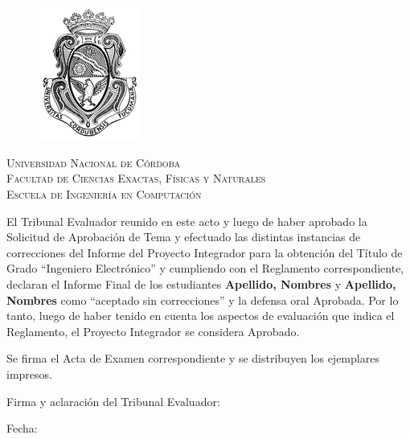 \chapter*{}
\begin{center}
	
	\begin{figure}[h]
		\begin{center}
			\includegraphics[scale=0.8]{logo_unc.png}
		\end{center}
	\end{figure}
	\vspace{0.25em}
	
	\textsc{\LARGE Universidad Nacional de Córdoba}\\[0.3cm] %
	\textsc{\large Facultad de Ciencias Exactas, Físicas y Naturales}\\[0.3cm] %
	\textsc{\large Escuela de Ingeniería en Computación}\\[0.75cm] %
\end{center}


El Tribunal Evaluador reunido en este acto y luego de haber aprobado la Solicitud de Aprobación de Tema 
y efectuado las distintas instancias de correcciones del Informe del Proyecto Integrador para la obtención 
del Título de Grado “Ingeniero Electrónico” y cumpliendo con el Reglamento correspondiente, declaran el Informe 
Final de los estudiantes \textbf{Apellido, Nombres} y \textbf{Apellido, Nombres} como “aceptado sin correcciones” 
y la defensa oral Aprobada. Por lo tanto, luego de haber tenido en cuenta los aspectos de evaluación que indica el 
Reglamento, el Proyecto Integrador se considera Aprobado. 

\vspace{0.5cm}

\par Se firma el Acta de Examen correspondiente y se distribuyen los ejemplares impresos.

\vspace{4.5cm}

Firma y aclaración del Tribunal Evaluador:

\vspace{0.5cm}

Fecha:

\clearpage{\thispagestyle{empty}\cleardoublepage}       %